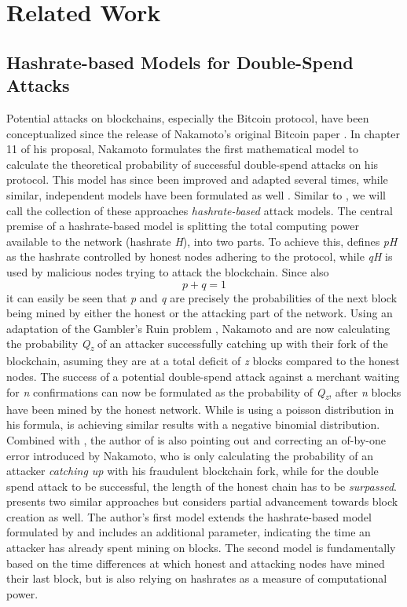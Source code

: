\documentclass[a4paper,12pt,twoside]{report}
\begin{document}

\chapter{Related Work}
\section{Hashrate-based Models for Double-Spend Attacks}
Potential attacks on blockchains, especially the Bitcoin protocol, have been conceptualized since the release of Nakamoto's original Bitcoin paper \cite{nakamoto2008bitcoin}. In chapter 11 of his proposal, Nakamoto formulates the first mathematical model to calculate the theoretical probability of successful double-spend attacks on his protocol. This model has since been improved and adapted several times, while similar, independent models have been formulated as well \cite{HBDSA,DSAwithTime,NakamotoDSACorrection,NakamotoExplMCSim}. Similar to \cite{DSAwithTime}, we will call the collection of these approaches \textit{hashrate-based} attack models. The central premise of a hashrate-based model is splitting the total computing power available to the network (hashrate \textit{H}), into two parts. To achieve this, \cite{HBDSA} defines \textit{pH} as the hashrate controlled by honest nodes adhering to the protocol, while \textit{qH} is used by malicious nodes trying to attack the blockchain. Since also
\begin{equation}
p + q = 1
\end{equation}
it can easily be seen that \textit{p} and \textit{q} are precisely the probabilities of the next block being mined by either the honest or the attacking part of the network. Using an adaptation of the Gambler's Ruin problem \cite{gamblersruin}, Nakamoto and \cite{HBDSA} are now calculating the probability \textit{Q\textsubscript{z}} of an attacker successfully catching up with their fork of the blockchain, asuming they are at a total deficit of \textit{z} blocks compared to the honest nodes. The success of a potential double-spend attack against a merchant waiting for \textit{n} confirmations can now be formulated as the probability of \textit{Q\textsubscript{z}}, after \textit{n} blocks have been mined by the honest network. While \cite{nakamoto2008bitcoin} is using a poisson distribution in his formula, \cite{HBDSA} is achieving similar results with a negative binomial distribution. Combined with \cite{NakamotoDSACorrection}, the author of \cite{HBDSA} is also pointing out and correcting an of-by-one error introduced by Nakamoto, who is only calculating the probability of an attacker \textit{catching up} with his fraudulent blockchain fork, while for the double spend attack to be successful, the length of the honest chain has to be \textit{surpassed}. \cite{DSAwithTime} presents two similar approaches but considers partial advancement towards block creation as well. The author's first model extends the hashrate-based model formulated by \cite{HBDSA} and includes an additional parameter, indicating the time an attacker has already spent mining on blocks. The second model is fundamentally based on the time differences at which honest and attacking nodes have mined their last block, but is also relying on hashrates as a measure of computational power.
\end{document}
